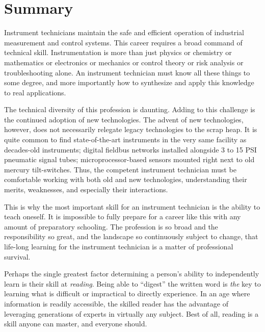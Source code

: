 \filbreak
\section{Summary}

Instrument technicians maintain the safe and efficient operation of industrial measurement and control systems.  This career requires a broad command of technical skill.  Instrumentation is more than just physics or chemistry or mathematics or electronics or mechanics or control theory or risk analysis or troubleshooting alone.  An instrument technician must know all these things to some degree, and more importantly how to synthesize and apply this knowledge to real applications.

The technical diversity of this profession is daunting.  Adding to this challenge is the continued adoption of new technologies.  The advent of new technologies, however, does not necessarily relegate legacy technologies to the scrap heap.  It is quite common to find state-of-the-art instruments in the very same facility as decades-old instruments; digital fieldbus networks installed alongside 3 to 15 PSI pneumatic signal tubes; microprocessor-based sensors mounted right next to old mercury tilt-switches.  Thus, the competent instrument technician must be comfortable working with both old and new technologies, understanding their merits, weaknesses, and especially their interactions.

This is why the most important skill for an instrument technician is the ability to teach oneself.  It is impossible to fully prepare for a career like this with any amount of preparatory schooling.  The profession is so broad and the responsibility so great, and the landscape so continuously subject to change, that life-long learning for the instrument technician is a matter of professional survival.  

\vskip 10pt

Perhaps the single greatest factor determining a person's ability to independently learn is their skill at \textit{reading}.  Being able to ``digest'' the written word is \textit{the} key to learning what is difficult or impractical to directly experience.  In an age where information is readily accessible, the skilled reader has the advantage of leveraging generations of experts in virtually any subject.  Best of all, reading is a skill anyone can master, and everyone should.

